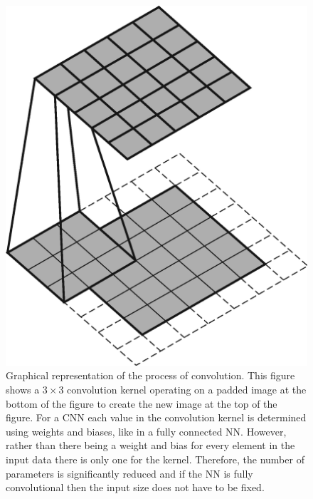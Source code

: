             \begin{figure}
                \centering
                
                \includegraphics[width=1.0\linewidth]{figures/background_cnn.png}
                
                \captionsetup{singlelinecheck=false}
                \caption{
                    Graphical representation of the process of convolution. This figure shows a $3\times3$ convolution kernel operating on a padded image at the bottom of the figure to create the new image at the top of the figure. For a \gls{CNN} each value in the convolution kernel is determined using weights and biases, like in a fully connected \gls{NN}. However, rather than there being a weight and bias for every element in the input data there is only one for the kernel. Therefore, the number of parameters is significantly reduced and if the \gls{NN} is fully convolutional then the input size does not have to be fixed.
                }
                \label{fig:pseudo_bayesian_dip_denoising_as_a_preprocessing_step_for_kinetic_modelling_in_dynamic_pet_appendix_methods_network_design_and_execution_cnn}
            \end{figure}
            
